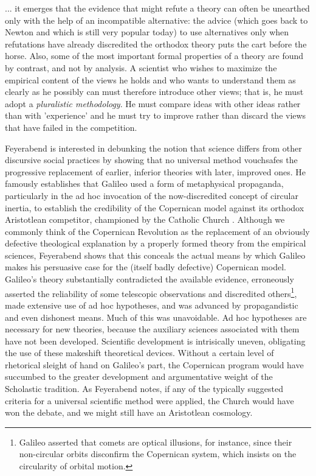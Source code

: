\begin{longquote}
... it emerges that the evidence that might refute a
theory can often be unearthed only with the help of an incompatible
alternative: the advice (which goes back to Newton and which is still
very popular today) to use alternatives only when refutations have
already discredited the orthodox theory puts the cart before the
horse. Also, some of the most important formal properties of a theory
are found by contrast, and not by analysis. A scientist who wishes to
maximize the empirical content of the views he holds and who wants
to understand them as clearly as he possibly can must therefore
introduce other views; that is, he must adopt a \textit{pluralistic methodology}.
He must compare ideas with other ideas rather than with
'experience' and he must try to improve rather than discard the views
that have failed in the competition. \cite[p.20]{Feyerabend1993}
\end{longquote}

Feyerabend is interested in debunking the notion that science differs from other discursive social practices by showing that no universal method vouchsafes the progressive replacement of earlier, inferior theories with later, improved ones. He famously establishes that Galileo used a form of metaphysical propaganda, particularly in the ad hoc invocation of the now-discredited concept of circular inertia, to establish the credibility of the Copernican model against its orthodox Aristotlean competitor, championed by the Catholic Church \cite{Feyerabend1993}. Although we commonly think of the Copernican Revolution as the replacement of an obviously defective theological explanation by a properly formed theory from the empirical sciences, Feyerabend shows that this conceals the actual means by which Galileo makes his persuasive case for the (itself badly defective) Copernican model.  Galileo's theory substantially contradicted the available evidence, erroneously asserted the reliability of some telescopic observations and discredited others\footnote{Galileo asserted that comets are optical illusions, for instance, since their non-circular orbits disconfirm the Copernican system, which insists on the circularity of orbital motion.}, made extensive use of ad hoc hypotheses, and was advanced by propagandistic and even dishonest means. Much of this was unavoidable. Ad hoc hypotheses are necessary for new theories, because the auxiliary sciences associated with them have not been developed. Scientific development is intrisically uneven, obligating the use of these makeshift theoretical devices. Without a certain level of rhetorical sleight of hand on Galileo's part, the Copernican program would have succumbed to the greater development and argumentative weight of the Scholastic tradition. As Feyerabend notes, if any of the typically suggested criteria for a universal scientific method were applied, the Church would have won the debate, and we might still have an Aristotlean cosmology. 

